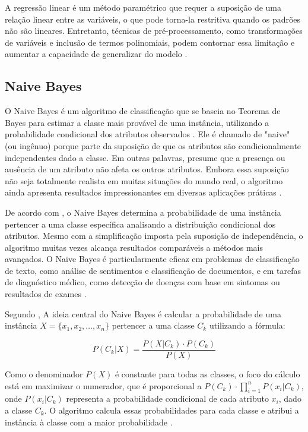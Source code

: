 A regressão linear é um método paramétrico que requer a suposição de uma relação linear entre as variáveis, o que pode torna-la restritiva quando os padrões não são lineares. Entretanto, técnicas de pré-processamento, como transformações de variáveis e inclusão de termos polinomiais, podem contornar essa limitação e aumentar a capacidade de generalizar do modelo \cite{montgomery2009}.

\subsection{Naive Bayes}
O Naive Bayes é um algoritmo de classificação que se baseia no Teorema de Bayes para estimar a classe mais provável de uma instância, utilizando a probabilidade condicional dos atributos observados \cite{rish2001}. Ele é chamado de "naive" (ou ingênuo) porque parte da suposição de que os atributos são condicionalmente independentes dado a classe. Em outras palavras, presume que a presença ou ausência de um atributo não afeta os outros atributos. Embora essa suposição não seja totalmente realista em muitas situações do mundo real, o algoritmo ainda apresenta resultados impressionantes em diversas aplicações práticas \cite{rish2001}.

De acordo com , o Naive Bayes determina a probabilidade de uma instância pertencer a uma classe específica analisando a distribuição condicional dos atributos. Mesmo com a simplificação imposta pela suposição de independência, o algoritmo muitas vezes alcança resultados comparáveis a métodos mais avançados. O Naive Bayes é particularmente eficaz em problemas de classificação de texto, como análise de sentimentos e classificação de documentos, e em tarefas de diagnóstico médico, como detecção de doenças com base em sintomas ou resultados de exames \cite{rish2001}.


Segundo , A ideia central do Naive Bayes é calcular a probabilidade de uma instância $X = \{x_1, x_2, \dots, x_n\}$ pertencer a uma classe $C_k$ utilizando a fórmula:

$$P(C_k|X) = \frac{P(X|C_k) \cdot P(C_k)}{P(X)}$$

Como o denominador $P(X)$ é constante para todas as classes, o foco do cálculo está em maximizar o numerador, que é proporcional a $P(C_k) \cdot \prod_{i=1}^{n} P(x_i | C_k)$, onde $P(x_i | C_k)$ representa a probabilidade condicional de cada atributo $x_i$, dado a classe $C_k$. O algoritmo calcula essas probabilidades para cada classe e atribui a instância à classe com a maior probabilidade \cite{zhang2004}. 

